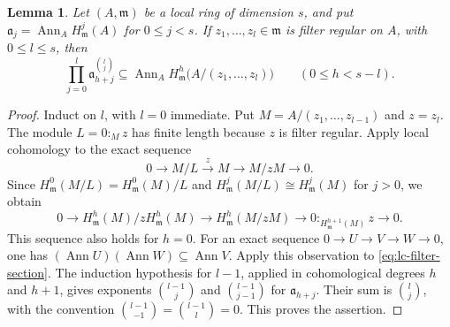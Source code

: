 \documentclass[11pt,reqno]{amsart}
\numberwithin{equation}{section}
\newtheorem{lemma}[theorem]{Lemma}
\theoremstyle{definition}
\newcommand{\m}{\mathfrak m}
\begin{document}
\begin{lemma}\label{lem:ann-propagation}
Let $(A,\m)$ be a local ring of dimension $s$, and put
$\mathfrak a_j=\operatorname{Ann}_A H^j_{\m}(A)$ for $0\le j<s$.
If $z_1,\ldots,z_l\in\m$ is filter regular on $A$, with $0\le l\le s$,
then
\[
 \prod_{j=0}^{l}\mathfrak a_{h+j}^{\binom lj}
 \subseteq
 \operatorname{Ann}_A H^h_{\m}\bigl(A/(z_1,\ldots,z_l)\bigr)
 \qquad(0\le h<s-l).
\]
\end{lemma}
\begin{proof}
Induct on $l$, with $l=0$ immediate. Put
$M=A/(z_1,\ldots,z_{l-1})$ and $z=z_l$.
The module $L=0:_Mz$ has finite length because $z$ is filter regular.
Apply local cohomology to the exact sequence
\[
 0\longrightarrow M/L\xrightarrow{z}M
 \longrightarrow M/zM\longrightarrow0.
\]
Since $H^0_{\m}(M/L)=H^0_{\m}(M)/L$ and
$H^j_{\m}(M/L)\cong H^j_{\m}(M)$ for $j>0$, we obtain
\begin{equation}\label{eq:lc-filter-section}
0\longrightarrow H^h_{\m}(M)/zH^h_{\m}(M)
 \longrightarrow H^h_{\m}(M/zM)
 \longrightarrow 0:_{H^{h+1}_{\m}(M)}z\longrightarrow0.
\end{equation}
This sequence also holds for $h=0$.
For an exact sequence $0\to U\to V\to W\to0$, one has
$(\operatorname{Ann}U)(\operatorname{Ann}W)\subseteq
\operatorname{Ann}V$.  Apply this observation to
\eqref{eq:lc-filter-section}. The induction hypothesis for $l-1$,
applied in cohomological degrees $h$ and $h+1$, gives exponents
$\binom{l-1}{j}$ and
$\binom{l-1}{j-1}$ for $\mathfrak a_{h+j}$. Their sum is
$\binom lj$, with the convention
$\binom{l-1}{-1}=\binom{l-1}{l}=0$.
This proves the assertion.
\end{proof}
\end{document}
